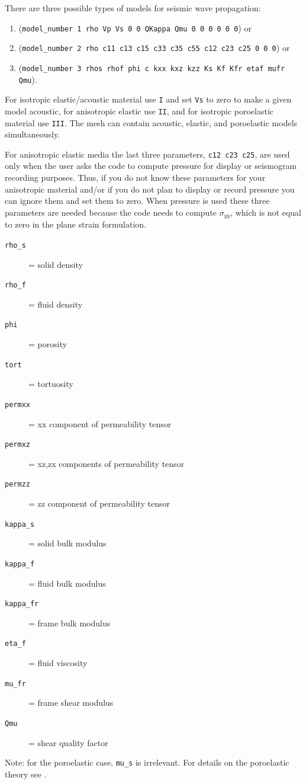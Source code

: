 \begin{description}[style=nextline, labelindent=1em, font=\normalfont]
\item[In section \textbf{"\# define models...."}:]
There are three possible types of models for seismic wave propagation:
  \begin{enumerate}[label=\ttfamily \Roman*:]
    \item (\texttt{model\_number 1 rho Vp Vs 0 0 QKappa Qmu 0 0 0 0 0 0}) or
    \item (\texttt{model\_number 2 rho c11 c13 c15 c33 c35 c55 c12 c23 c25 0 0 0}) or
    \item (\texttt{model\_number 3 rhos rhof phi c kxx kxz kzz Ks Kf Kfr etaf mufr Qmu}).
  \end{enumerate}

For isotropic elastic/acoustic material use \texttt{I} and set \texttt{Vs} to zero to make a given model acoustic, for anisotropic elastic use \texttt{II},
and for isotropic poroelastic material use \texttt{III}. The mesh can contain acoustic, elastic, and poroelastic models simultaneously.

For anisotropic elastic media the last three parameters, \texttt{c12 c23 c25}, are used only when the user asks the code to compute pressure for display
or seismogram recording purposes. Thus, if you do not know these parameters for your anisotropic material and/or if you do not plan to display or record pressure you
can ignore them and set them to zero. When pressure is used these three parameters are needed because the code needs to compute $\sigma_{yy}$,
which is not equal to zero in the plane strain formulation.

\begin{description}
\item[{\texttt{rho\_s}}] = solid density
\item[{\texttt{rho\_f}}] = fluid density
\item[{\texttt{phi}}] = porosity
\item[{\texttt{tort}}] = tortuosity
\item[{\texttt{permxx}}] = xx component of permeability tensor
\item[{\texttt{permxz}}] = xz,zx components of permeability tensor
\item[{\texttt{permzz}}] = zz component of permeability tensor
\item[{\texttt{kappa\_s}}] = solid bulk modulus
\item[{\texttt{kappa\_f}}] = fluid bulk modulus
\item[{\texttt{kappa\_fr}}] = frame bulk modulus
\item[{\texttt{eta\_f}}] = fluid viscosity
\item[{\texttt{mu\_fr}}] = frame shear modulus
\item[{\texttt{Qmu}}] = shear quality factor
\end{description}

Note: for the poroelastic case, \texttt{mu\_s} is irrelevant.
For details on the poroelastic theory see \cite{MoTr08}.

\end{description}

